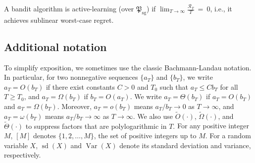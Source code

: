 \documentclass[nonblindrev]{informs3_noinforms}
\newcommand{\var}{\operatorname{Var}}
\DeclareMathOperator{\sd}{sd}
\begin{document}
\begin{definition}\label{def:active-learning}
A bandit algorithm is {active-learning} (over $\mathfrak{P}_{\mathrm{sg}}$) if $\lim_{T \to\infty}  \frac{\mathcal R_T}{T}\ =\ 0$, i.e., it achieves sublinear worst-case regret.
\end{definition}
{\subsection{Additional notation}
To simplify exposition, we sometimes use the classic Bachmann-Landau notation. 
{In particular, for two nonnegative sequences $\{a_T\}$ and $\{b_T\}$, we write $a_T = O(b_T)$ if there exist constants $C>0$ and $T_0$ such that $a_T \le C b_T$ for all $T \ge T_0$, and $a_T = \Omega(b_T)$ if $b_T = O(a_T)$. We write $a_T = \Theta(b_T)$ if $a_T = O(b_T)$ and $a_T = \Omega(b_T)$. Moreover, $a_T = o(b_T)$ means $a_T/b_T \to 0$ as $T\to\infty$, and $a_T = \omega(b_T)$ means $a_T/b_T \to \infty$ as $T\to\infty$. We also use $\tilde{O}(\cdot)$, $\tilde{\Omega}(\cdot)$, and $\tilde{\Theta}(\cdot)$ to suppress factors that are polylogarithmic in $T$.} For any positive integer $M$, $[M]$ denotes $\{1, 2, \dots, M\}$, the set of positive integers up to $M.$ For a random variable $X$, $\sd(X)$ and $\var(X)$ denote its standard deviation and variance, respectively. 
}
\end{document}
